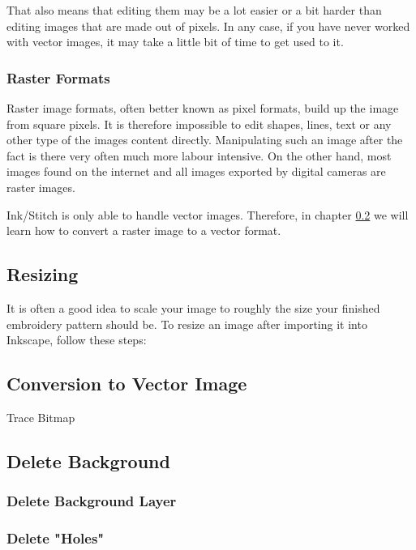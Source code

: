 \documentclass{article}
\begin{document}
                That also means that editing them may be a lot easier or a bit harder than editing images that are made out of pixels.
                In any case, if you have never worked with vector images, it may take a little bit of time to get used to it.

            \subsubsection{Raster Formats}

                Raster image formats, often better known as pixel formats, build up the image from square pixels. It is therefore impossible to edit shapes, lines, text or any other type of the images content directly.
                Manipulating such an image after the fact is there very often much more labour intensive. On the other hand, most images found on the internet and all images exported by digital cameras are raster images.

                Ink/Stitch is only able to handle vector images. Therefore, in chapter \ref{vectorConversion}  we will learn how to  convert a raster image to a vector format. 
        
        \subsection{Resizing}

        It is often a good idea to scale your image to roughly the size your finished embroidery pattern should be. To resize an image after importing it into Inkscape, follow these steps:  
        
        \subsection{Conversion to Vector Image} \label{vectorConversion}
        Trace Bitmap    

        \subsection{Delete Background}
        \subsubsection{Delete Background Layer}
        \subsubsection{Delete "Holes"}        
        
\end{document}

